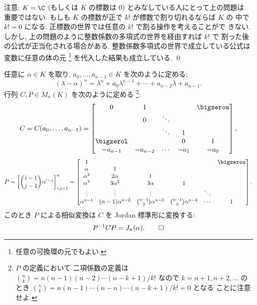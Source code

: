 \documentclass[12pt,twoside]{jarticle}
\begin{document}
\medskip
\noindent
注意: $K=\C$ (もしくは $K$ の標数は $0$) とみなしている人にとって上の問題は
重要ではない.  もしも $K$ の標数が正で $k!$ が標数で割り切れるならば $K$ の
中で $k!=0$ になる.  正標数の世界では任意の $k!$ で割る操作を考えることがで
きない.   しかし, 上の問題のように整数係数の多項式の世界を経由すれば $k!$ で
割った後の公式が正当化される場合がある.  
整数係数多項式の世界で成立している公式は変数に任意の体の元%
\footnote{任意の可換環の元でもよい.}%
を代入した結果も成立している.
\qed


\begin{question}
\label{q:p_C=(lambda-alpha)^n}
  任意に $\alpha\in K$ を取り, $a_0,\dots,a_{n-1}\in K$ を次のように定める:
  \begin{equation*}
    (\lambda-\alpha)^n 
    = \lambda^n + a_0 \lambda^{n-1} + \cdots + a_{n-2}\lambda + a_{n-1}.
  \end{equation*}
  行列 $C,P\in M_n(K)$ を次のように定める%
  \footnote{$P$ の定義において
    二項係数の定義は $\binom{n}{k} = n(n-1)(n-2)\cdots(n-k+1)/k!$ 
    なので $k=n+1,n+2,\ldots$ の
    とき $\binom{n}{k} = n(n-1)\cdots(n-n)\cdots(n-k+1)/k! = 0$ となる
    ことに注意せよ.}:
  \begin{equation*}
    C =
    C(a_0,\dots,a_{n-1}) =
    \begin{bmatrix}
      0         &    1     &        &      & \bigzerou \\
                &    0     & \ddots &      & \\
                &          & \ddots &  1   & \\
      \bigzerol &          &        &  0   &  1 \\
      -a_{n-1}  & -a_{n-2} & \cdots & -a_1 & -a_0 \\
    \end{bmatrix},
  \end{equation*}
  \begin{equation*}
    P = \left[ \binom{i-1}{j-1}\alpha^{i-j} \right]_{i,j=1}^n = 
    \begin{bmatrix}
      1            &                   &         & & & \bigzerou \\
      \alpha       & 1                 &         & & & \\
      \alpha^2     & 2\alpha           & 1       & & & \\
      \alpha^3     & 3\alpha^2         & 3\alpha & 1 & & \\
      \vdots       & \vdots            & \vdots  & & \ddots & \\
      \alpha^{n-1} & (n-1)\alpha^{n-2} & \binom{n-1}{2}\alpha^{n-3} & \binom{n-1}{3}\alpha^{n-4} & \cdots & 1 \\
    \end{bmatrix}.
  \end{equation*}
  このとき $P$ による相似変換は $C$ を Jordan 標準形に変換する:
  \begin{equation*}
    P^{-1}CP = J_n(\alpha).
    \qed
  \end{equation*}
\end{question}
\end{document}
